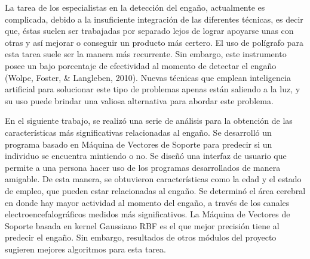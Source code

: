 La tarea de los especialistas en la detección del engaño, actualmente es complicada, debido a la insuficiente integración de las diferentes técnicas, es decir que, éstas suelen ser trabajadas por separado lejos de lograr apoyarse unas con otras y así mejorar o conseguir un producto más certero. El uso de polígrafo para esta tarea suele ser la manera más recurrente. Sin embargo, este instrumento posee un bajo porcentaje de efectividad al momento de detectar el engaño (Wolpe, Foster, \& Langleben, 2010). Nuevas técnicas que emplean inteligencia artificial para solucionar este tipo de problemas apenas están saliendo a la luz, y su uso puede brindar una valiosa alternativa para abordar este problema.

En el siguiente trabajo, se realizó una serie de análisis para la obtención de las características más significativas relacionadas al engaño. Se desarrolló un programa basado en Máquina de Vectores de Soporte para predecir si un individuo se encuentra mintiendo o no. Se diseñó una interfaz de usuario que permite a una persona hacer uso de los programas desarrollados de manera amigable. De esta manera, se obtuvieron características como la edad y el estado de empleo, que pueden estar relacionadas al engaño. Se determinó el área cerebral en donde hay mayor actividad al momento del engaño, a través de los canales electroencefalográficos medidos más significativos. La Máquina de Vectores de Soporte basada en kernel Gaussiano RBF es el que mejor precisión tiene al predecir el engaño. Sin embargo, resultados de otros módulos del proyecto sugieren mejores algoritmos para esta tarea. 
